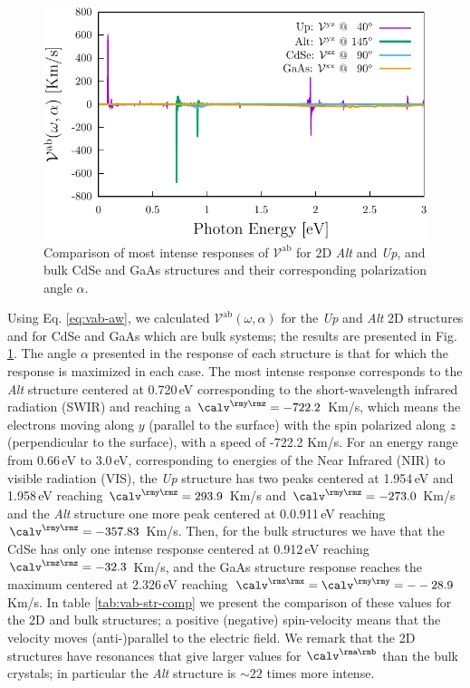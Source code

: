 \documentclass[prb,11pt,tightenlines,twocolumn,aps]{revtex4-1}
\begin{document}
\begin{figure}[t]
    \centering
    \includegraphics[width=\linewidth]{plots/vab-str-comp}
    
    \caption{Comparison of most intense responses of
    $\mathcal{V}^{\mathrm{ab}}$ for 2D \emph{Alt} and \emph{Up}, and bulk CdSe
    and GaAs structures and their corresponding polarization angle $\alpha$.}
    \label{fig:vab-str-comp}
\end{figure}

Using  Eq. \eqref{eq:vab-aw}, we calculated 
$\mathcal{V}^{\mathrm{ab}}(\omega,\alpha)$ for the \emph{Up} and
\emph{Alt} 2D structures and for CdSe and GaAs which are bulk systems; 
the results
are presented in Fig. \ref{fig:vab-str-comp}. 
The angle $\alpha$ presented in
the response of each structure is that for which the response is maximized in
each case.
% 
The most intense response corresponds to the \emph{Alt} structure centered at
0.720\,eV corresponding to the short-wavelength infrared radiation (SWIR) and
reaching a $\calv^{\rmy\rmz}=-722.2$ Km/s, which means the electrons moving
along $y$ (parallel to the surface) with the spin polarized along $z$
(perpendicular to the surface), with a speed of -722.2 Km/s.
% 
For an energy range from 0.66\,eV to 3.0\,eV, corresponding to energies of the
Near Infrared (NIR) to visible radiation (VIS), the \emph{Up} structure has two
peaks centered at 1.954\,eV and 1.958\,eV reaching $\calv^{\rmy\rmz}=293.9$
Km/s and $\calv^{\rmy\rmz}=-273.0$ Km/s and the \emph{Alt} structure one more
peak centered at 0.0.911\,eV reaching $\calv^{\rmy\rmz}=-357.83$ Km/s.
% 
Then, for the bulk structures we have that the CdSe has only one intense
response centered at 0.912\,eV reaching $\calv^{\rmz\rmz}=-32.3$ Km/s, and the
GaAs structure response reaches the maximum centered at 2.326\,eV reaching
$\calv^{\rmx\rmx}=\calv^{\rmy\rmy}=--28.9$ Km/s.
% 
In table \ref{tab:vab-str-comp} we present the comparison of these values for
the 2D and bulk structures; a positive (negative) spin-velocity means that the
velocity moves (anti-)parallel to the electric field.
% 
We remark that the 2D structures have resonances that give larger values for
$\calv^{\rma\rmb}$ than the bulk crystals; in particular the \emph{Alt}
structure is $\sim 22$ times more intense.
\end{document}

